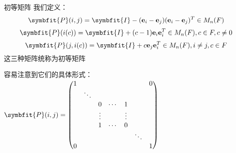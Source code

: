 \documentclass[12pt, a4paper, oneside, UTF8]{ctexbook}
\begin{document}
\begin{para}{0}
\begin{defn}{初等矩阵}{}
					我们定义：
					\begin{equation}
						\symbfit{P}(i,j)=\symbfit{I}-(\mathbf{e}_i-\mathbf{e}_j)(\mathbf{e}_i-\mathbf{e}_j)^T \in M_n(F)
					\end{equation}
					\begin{equation}
						\symbfit{P}(i(c))=\symbfit{I}+(c-1)\mathbf{e}_i \mathbf{e}_i^T \in M_n(F),c \in F,c \neq 0
					\end{equation}
					\begin{equation}
						\symbfit{P}(j,i(c))=\symbfit{I}+c\mathbf{e}_j \mathbf{e}_i^T \in M_n(F),i \neq j,c \in F
					\end{equation}
					这三种矩阵统称为初等矩阵
				\end{defn}
				容易注意到它们的具体形式：
				$\symbfit{P}(i,j)=\begin{pmatrix}
					1      &        &        &        &        &        &  0      \\
						& \ddots &        &        &        &        &        \\
						&        & 0      & \cdots & 1      &        &        \\
						&        & \vdots &        & \vdots &        &        \\
						&        & 1      & \cdots & 0      &        &        \\
						&        &        &        &        & \ddots &        \\
					0	&        &        &        &        &        & 1
					\end{pmatrix}$


\end{para}
\end{document}
